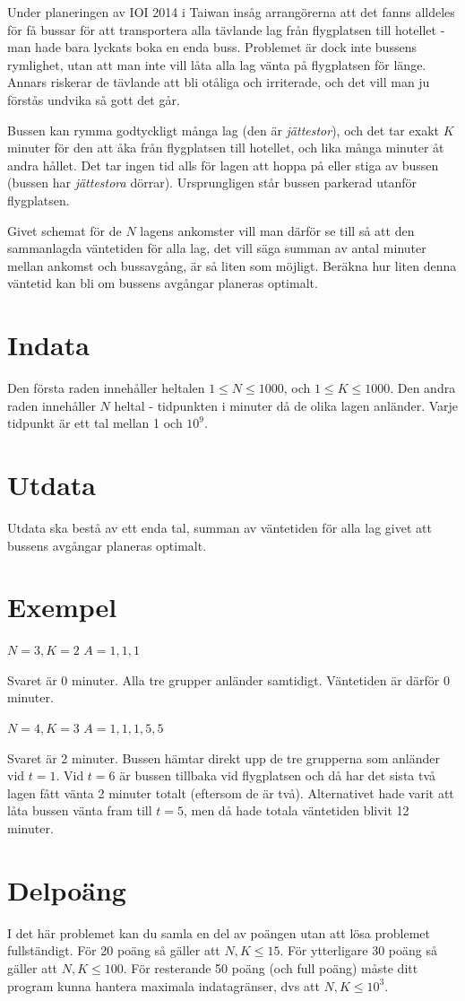 
Under planeringen av IOI 2014 i Taiwan insåg arrangörerna att det fanns alldeles för få bussar för att transportera alla tävlande lag från flygplatsen till hotellet - man hade bara lyckats boka en enda buss. Problemet är dock inte bussens rymlighet, utan att man inte vill låta alla lag vänta på flygplatsen för länge. Annars riskerar de tävlande att bli otåliga och irriterade, och det vill man ju förstås undvika så gott det går.

Bussen kan rymma godtyckligt många lag (den är \emph{jättestor}), och det tar exakt $K$ minuter för den att åka från flygplatsen till hotellet, och lika många minuter åt andra hållet. Det tar ingen tid alls för lagen att hoppa på eller stiga av bussen (bussen har \emph{jättestora} dörrar). Ursprungligen står bussen parkerad utanför flygplatsen.

Givet schemat för de $N$ lagens ankomster vill man därför se till så att den sammanlagda väntetiden för alla lag, det vill säga summan av antal minuter mellan ankomst och bussavgång, är så liten som möjligt. Beräkna hur liten denna väntetid kan bli om bussens avgångar planeras optimalt.

\section*{Indata}
Den första raden innehåller heltalen $1 \leq N \leq 1 000$, och $1 \leq K \leq 1000$.
Den andra raden innehåller $N$ heltal - tidpunkten i minuter då de olika lagen anländer. Varje tidpunkt är ett tal mellan 1 och $10^9$.

\section*{Utdata}
Utdata ska bestå av ett enda tal, summan av väntetiden för alla lag givet att bussens avgångar planeras optimalt.

\section*{Exempel}
$N = 3, K = 2$
$A = {1, 1, 1}$

Svaret är 0 minuter. Alla tre grupper anländer samtidigt. Väntetiden är därför 0 minuter.

$N = 4, K = 3$
$A = {1, 1, 1, 5, 5}$

Svaret är 2 minuter. Bussen hämtar direkt upp de tre grupperna som anländer vid $t = 1$. Vid $t = 6$ är bussen tillbaka vid flygplatsen och då har det sista två lagen fått vänta 2 minuter totalt (eftersom de är två). Alternativet hade varit att låta bussen vänta fram till $t = 5$, men då hade totala väntetiden blivit 12 minuter.

\section*{Delpoäng}
I det här problemet kan du samla en del av poängen utan att lösa problemet fullständigt. För 20 poäng så gäller att $N, K \leq 15$. För ytterligare 30 poäng så gäller att $N,K \leq 100$. För resterande 50 poäng (och full poäng) måste ditt program kunna hantera maximala indatagränser, dvs att $N, K \leq 10^3$.
